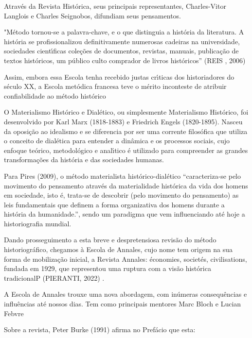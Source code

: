 \documentclass[
12pt,		%
openright,	%
twoside,  %
a4paper,			%
chapter=TITLE,		%
english,			%
french,				%
spanish,			%
brazil				%
]{USPSC-classe/USPSC}
\begin{document}
Atrav\'es da Revista Hist\'orica, seus principais representantes, Charles-Vitor Langlois e Charles Seignobos, difundiam seus pensamentos.


"M\'etodo tornou-se a palavra-chave, e o que distinguia a hist\'oria da literatura. A hist\'oria se profissionalizou definitivamente numerosas cadeiras na universidade, sociedades cient\'{\i}ficas cole\c{c}\~oes de documentos, revistas, manuais, publica\c{c}\~ao de textos hist\'oricos, um p\'ublico culto comprador de livros hist\'oricos”  (REIS , 2006)

Assim, embora essa Escola tenha recebido justas cr\'{\i}ticas dos historiadores do s\'eculo XX, a Escola met\'odica francesa teve o m\'erito inconteste de atribuir confiabilidade ao m\'etodo hist\'orico


O Materialismo Hist\'orico e Dial\'etico, ou simplesmente Materialismo Hist\'orico, foi desenvolvido  por Karl Marx (1818-1883) e Friedrich Engels (1820-1895). Nasceu da oposi\c{c}\~ao ao idealismo e se diferencia por ser uma corrente filos\'ofica que utiliza o conceito de dial\'etica para entender a din\^amica e os processos sociais, cujo enfoque te\'orico, metodol\'ogico e anal\'{\i}tico \'e utilizado para compreender as grandes transforma\c{c}\~oes da hist\'oria e das sociedades humanas.


Para  Pires (2009), o m\'etodo materialista hist\'orico-dial\'etico “caracteriza-se pelo movimento do pensamento atrav\'es da materialidade hist\'orica da vida dos homens em sociedade, isto \'e, trata-se de descobrir (pelo movimento do pensamento) as leis fundamentais que definem a forma organizativa dos homens durante a hist\'oria da humanidade.”, sendo um paradigma que vem influenciando at\'e hoje a historiografia mundial.


Dando prosseguimento a esta breve e despretensiosa revis\~ao do m\'etodo historiogr\'afico, chegamos \`a Escola de Annales, cujo nome tem origem na sua forma de mobiliza\c{c}\~ao inicial, a Revista Annales: \'economies, societ\'es, civilisations, fundada em 1929, que representou uma ruptura com a vis\~ao hist\'orica tradicionalP (PIERANTI, 2022) .


A Escola de Annales trouxe uma nova abordagem, com in\'umeras consequ\^encias e influ\^encias at\'e nossos dias. Tem como principais mentores  Marc Bloch e Lucian Febvre


Sobre a revista, Peter Burke (1991) afirma no Pref\'acio que esta:
\end{document}
